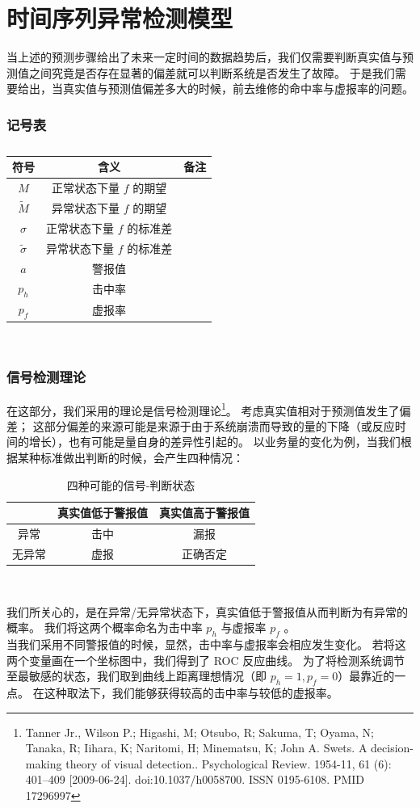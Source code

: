 \documentclass[a4paper]{article}
\begin{document}
\part{时间序列异常检测模型}
当上述的预测步骤给出了未来一定时间的数据趋势后，我们仅需要判断真实值与预测值之间究竟是否存在显著的偏差就可以判断系统是否发生了故障。
于是我们需要给出，当真实值与预测值偏差多大的时候，前去维修的命中率与虚报率的问题。
\section*{记号表}
\begin{table}[H]
	\centering
	\caption{}
	\label{tab:sdt_symbols}
	\begin{tabular}{ccc}
		\hline
		符号 & 含义 & 备注 \\
		\hline
		$M$ & 正常状态下量 $f$ 的期望 & \\
		$\tilde{M}$ & 异常状态下量 $f$ 的期望 & \\
		$\sigma$ & 正常状态下量 $f$ 的标准差 & \\
		$\tilde{\sigma}$ & 异常状态下量 $f$ 的标准差 & \\
		$a$ & 警报值 & \\
		$p_h$ & 击中率 & \\
		$p_f$ & 虚报率 & \\
		\hline
	\end{tabular} \\
\end{table}
\section{信号检测理论}
在这部分，我们采用的理论是信号检测理论\footnote{Tanner Jr., Wilson P.; Higashi, M; Otsubo, R; Sakuma, T; Oyama, N; Tanaka, R; Iihara, K; Naritomi, H; Minematsu, K; John A. Swets. A decision-making theory of visual detection.. Psychological Review. 1954-11, 61 (6): 401–409 [2009-06-24]. doi:10.1037/h0058700. ISSN 0195-6108. PMID 17296997}。
考虑真实值相对于预测值发生了偏差；
这部分偏差的来源可能是来源于由于系统崩溃而导致的量的下降（或反应时间的增长），也有可能是量自身的差异性引起的。
以业务量的变化为例，当我们根据某种标准做出判断的时候，会产生四种情况：
\begin{table}[H]
	\centering
	\caption{四种可能的信号-判断状态}
	\label{tab:sdt-four}
	\begin{tabular}{|c|c|c|}
		\hline
		 & 真实值低于警报值 & 真实值高于警报值 \\
		\hline
		异常 & 击中 & 漏报 \\
		\hline
		无异常 & 虚报 & 正确否定 \\
		\hline
	\end{tabular} \\
\end{table}
我们所关心的，是在异常/无异常状态下，真实值低于警报值从而判断为有异常的概率。
我们将这两个概率命名为击中率 $p_h$ 与虚报率 $p_f$ 。
\\
\indent 当我们采用不同警报值的时候，显然，击中率与虚报率会相应发生变化。
若将这两个变量画在一个坐标图中，我们得到了 ROC 反应曲线。
为了将检测系统调节至最敏感的状态，我们取到曲线上距离理想情况（即 $p_h = 1, p_f = 0$）最靠近的一点。
在这种取法下，我们能够获得较高的击中率与较低的虚报率。
\end{document}
